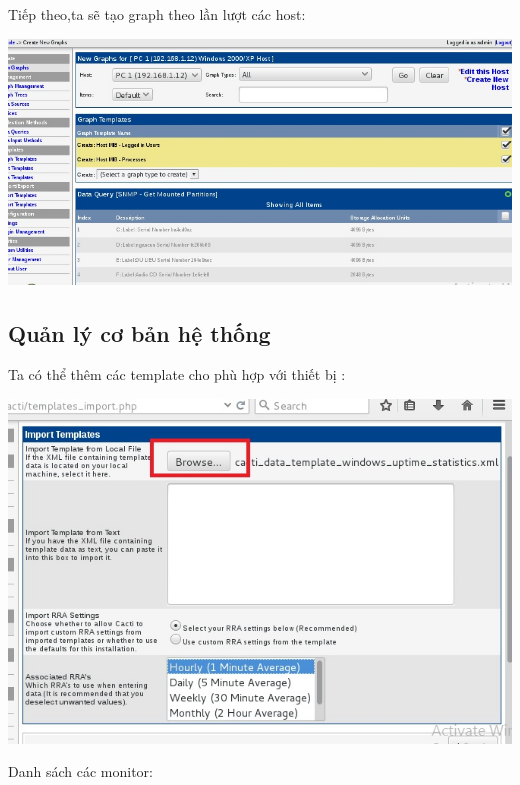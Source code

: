 \documentclass[12pt,oneside,a4paper,reqno]{report}
\begin{document}
\begin{large}
Tiếp theo,ta sẽ tạo graph theo lần lượt các host:

\begin{center}
	\includegraphics[scale=0.6]{images/cacti-new-graph.jpg}\\
\end{center}

\subsection{Quản lý cơ bản hệ thống}

Ta có thể thêm các template cho phù hợp với thiết bị :

\begin{center}
	\includegraphics[scale=0.6]{images/cacti-import-template.jpg}\\
\end{center}

Danh sách các monitor:


\end{large}
\end{document}
